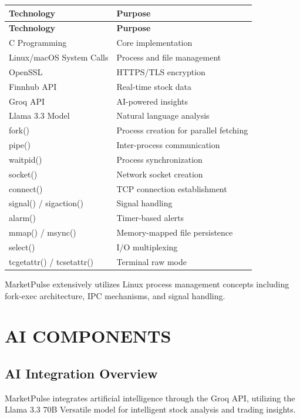 \documentclass[12pt,a4paper]{article}
\begin{document}
\begin{longtable}{|p{5cm}|p{8cm}|}
\hline
\textbf{Technology} & \textbf{Purpose} \\
\hline
\endfirsthead
\hline
\textbf{Technology} & \textbf{Purpose} \\
\hline
\endhead
C Programming & Core implementation \\
\hline
Linux/macOS System Calls & Process and file management \\
\hline
OpenSSL & HTTPS/TLS encryption \\
\hline
Finnhub API & Real-time stock data \\
\hline
Groq API & AI-powered insights \\
\hline
Llama 3.3 Model & Natural language analysis \\
\hline
fork() & Process creation for parallel fetching \\
\hline
pipe() & Inter-process communication \\
\hline
waitpid() & Process synchronization \\
\hline
socket() & Network socket creation \\
\hline
connect() & TCP connection establishment \\
\hline
signal() / sigaction() & Signal handling \\
\hline
alarm() & Timer-based alerts \\
\hline
mmap() / msync() & Memory-mapped file persistence \\
\hline
select() & I/O multiplexing \\
\hline
tcgetattr() / tcsetattr() & Terminal raw mode \\
\hline
\end{longtable}

MarketPulse extensively utilizes Linux process management concepts including fork-exec architecture, IPC mechanisms, and signal handling.

\newpage

\section{AI COMPONENTS}

\subsection{AI Integration Overview}

MarketPulse integrates artificial intelligence through the Groq API, utilizing the Llama 3.3 70B Versatile model for intelligent stock analysis and trading insights.
\end{document}
